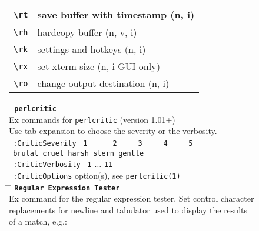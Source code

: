 \documentclass[oneside,10pt,landscape,DIV17]{scrartcl}
\begin{document}
\begin{multicols}{2}
\begin{tabular}[]{|p{11mm}|p{61mm}|}
\hline \verb'\rt'    & save buffer with timestamp               \hfill (n, i)   \\
\hline \verb'\rh'    & hardcopy buffer                          \hfill (n, v, i)\\
\hline \verb'\rk'    & settings and hotkeys                     \hfill (n, i)   \\
\hline \verb'\rx'    & set xterm size                           \hfill (n, i {\tiny GUI only})\\
\hline \verb'\ro'    & change output destination                \hfill (n, i)   \\
\hline
\end{tabular}%
%

\parbox[t][70mm][t]{120mm}{%
%
\begin{tabbing}
\hspace{30mm} \= \hspace{50mm} \= \kill
%
\textbf{\texttt{perlcritic}}\\[1.0ex]
%
Ex commands for \texttt{perlcritic} (version 1.01+)\\
Use tab expansion to choose the severity or the verbosity.\\[2.0ex]
\texttt{ :CriticSeverity}  \> \texttt{\ 1\ \ \ \ \ \ 2\ \ \ \ \ 3\ \ \ \ \ 4\ \ \ \ \ 5} \\
                           \> \texttt{\ brutal cruel harsh stern gentle} \\[1.0ex]
\texttt{ :CriticVerbosity} \> \texttt{\ 1} $\ldots$ \texttt{11}\\[1.0ex]
\texttt{ :CriticOptions}   \> option(s), see \texttt{perlcritic(1)}\\[5.5ex]
%
\hspace{40mm} \= \hspace{50mm} \= \kill
\textbf{\texttt{Regular Expression Tester}}\\[1.0ex]
%
Ex command for the regular expression tester. Set control character\\
replacements for newline and tabulator used to display the results\\
of a match, e.g.:\\[2.0ex]


\end{tabbing}}
\end{multicols}
\end{document}
